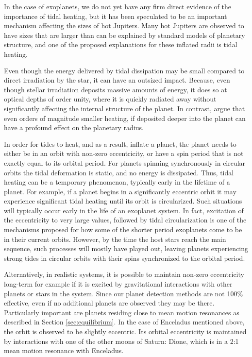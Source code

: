 In the case of exoplanets, we do not yet have any firm direct evidence of the
importance of tidal heating, but it has been speculated to be an important
mechanism affecting the sizes of hot Jupiters. Many hot Jupiters are observed to
have sizes that are larger than can be explained by standard models of planetary
structure, and one of the proposed explanations for these inflated radii is
tidal heating.

Even though the energy delivered by tidal dissipation may be small compared to
direct irradiation by the star, it can have an outsized impact. Because, even
though stellar irradiation deposits massive amounts of energy, it does so at
optical depths of order unity, where it is quickly radiated away without
significantly affecting the internal structure of the planet. In contrast,
\citet{Komacek_Youdin_17} argue that even orders of magnitude smaller heating,
if deposited deeper into the planet can have a profound effect on the planetary
radius.

In order for tides to heat, and as a result, inflate a planet, the planet needs
to either be in an orbit with non-zero eccentricity, or have a spin period that
is not exactly equal to its orbital period. For planets spinning synchronously
in circular orbits the tidal deformation is static, and no energy is dissipated.
Thus, tidal heating can be a temporary phenomenon, typically early in the
lifetime of a planet. For example, if a planet begins in a significantly
eccentric orbit it  may experience significant tidal heating until its orbit is
circularized. Such situations will typically occur early in the life of an
exoplanet system. In fact, excitation of the eccentricity to very large values,
followed by tidal circularization is one of the mechanisms proposed for how some
of the shorter period exoplanets come to be in their current orbits. However, by
the time the host stars reach the main sequence, such processes will mostly have
played out, leaving planets experiencing strong tides in circular orbits with
their spins synchronized to the orbital period.

Alternatively, in realistic systems, it is possible to maintain non-zero
eccentricity long-term for example if it is excited by gravitational
interactions with other planets or stars in the system. Since our planet
detection methods are not 100\% effective, even if no additional planets are
observed they may be there.  Particularly important are planets residing close
to mean motion resonances as described in Section \ref{sec:equilibrium}. In the
case of Enceladus mentioned above, the orbit is observed to be slightly
eccentric. Its orbital eccentricity is maintained by interactions with one of
the other moons of Saturn: Dione, which is in a 2:1 mean motion resonance with
Enceladus.

